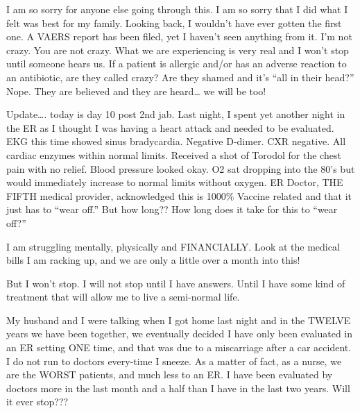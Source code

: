 I am so sorry for anyone else going through this. I am so sorry that I did what
I felt was best for my family. Looking back, I wouldn’t have ever gotten the
first one. A VAERS report has been filed, yet I haven’t seen anything from
it. I’m not crazy. You are not crazy. What we are experiencing is very real and
I won’t stop until someone hears us. If a patient is allergic and/or has an
adverse reaction to an antibiotic, are they called crazy? Are they shamed and
it’s “all in their head?” Nope. They are believed and they are heard… we will be
too!

Update…. today is day 10 post 2nd jab. Last night, I spent yet another night in
the ER as I thought I was having a heart attack and needed to be evaluated. EKG
this time showed sinus bradycardia. Negative D-dimer. CXR negative. All cardiac
enzymes within normal limits. Received a shot of Torodol for the chest pain with
no relief. Blood pressure looked okay. O2 sat dropping into the 80’s but would
immediately increase to normal limits without oxygen. ER Doctor, THE FIFTH
medical provider, acknowledged this is 1000\% Vaccine related and that it just
has to “wear off.” But how long?? How long does it take for this to “wear off?”

I am struggling mentally, physically and FINANCIALLY. Look at the medical bills
I am racking up, and we are only a little over a month into this!

But I won’t stop. I will not stop until I have answers. Until I have some kind
of treatment that will allow me to live a semi-normal life.

My husband and I were talking when I got home last night and in the TWELVE years
we have been together, we eventually decided I have only been evaluated in an ER
setting ONE time, and that was due to a miscarriage after a car accident. I do
not run to doctors every-time I sneeze. As a matter of fact, as a nurse, we are
the WORST patients, and much less to an ER. I have been evaluated by doctors
more in the last month and a half than I have in the last two years. Will it
ever stop???
